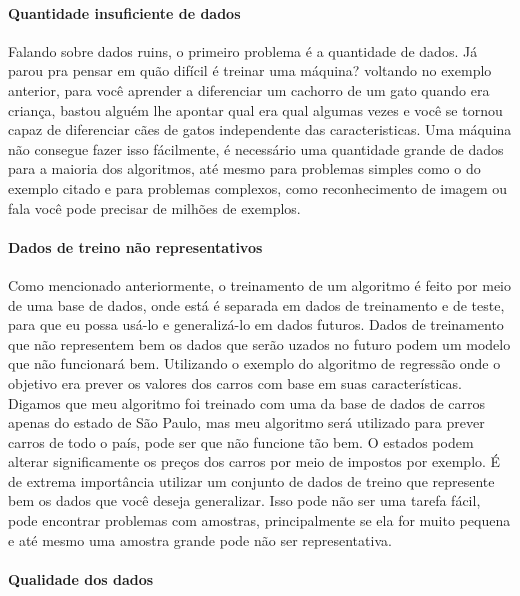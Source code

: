 \documentclass[
  letterpaper,
  DIV=11,
  numbers=noendperiod]{scrreprt}
\let\oldparagraph\paragraph
\renewcommand{\paragraph}[1]{\oldparagraph{#1}\mbox{}}
\begin{document}
\hypertarget{quantidade-insuficiente-de-dados}{%
\paragraph{Quantidade insuficiente de
dados}\label{quantidade-insuficiente-de-dados}}

Falando sobre dados ruins, o primeiro problema é a quantidade de dados.
Já parou pra pensar em quão difícil é treinar uma máquina? voltando no
exemplo anterior, para você aprender a diferenciar um cachorro de um
gato quando era criança, bastou alguém lhe apontar qual era qual algumas
vezes e você se tornou capaz de diferenciar cães de gatos independente
das caracteristicas. Uma máquina não consegue fazer isso fácilmente, é
necessário uma quantidade grande de dados para a maioria dos algoritmos,
até mesmo para problemas simples como o do exemplo citado e para
problemas complexos, como reconhecimento de imagem ou fala você pode
precisar de milhões de exemplos.

\hypertarget{dados-de-treino-nuxe3o-representativos}{%
\paragraph{Dados de treino não
representativos}\label{dados-de-treino-nuxe3o-representativos}}

Como mencionado anteriormente, o treinamento de um algoritmo é feito por
meio de uma base de dados, onde está é separada em dados de treinamento
e de teste, para que eu possa usá-lo e generalizá-lo em dados futuros.
Dados de treinamento que não representem bem os dados que serão uzados
no futuro podem um modelo que não funcionará bem. Utilizando o exemplo
do algoritmo de regressão onde o objetivo era prever os valores dos
carros com base em suas características. Digamos que meu algoritmo foi
treinado com uma da base de dados de carros apenas do estado de São
Paulo, mas meu algoritmo será utilizado para prever carros de todo o
país, pode ser que não funcione tão bem. O estados podem alterar
significamente os preços dos carros por meio de impostos por exemplo. É
de extrema importância utilizar um conjunto de dados de treino que
represente bem os dados que você deseja generalizar. Isso pode não ser
uma tarefa fácil, pode encontrar problemas com amostras, principalmente
se ela for muito pequena e até mesmo uma amostra grande pode não ser
representativa.

\hypertarget{qualidade-dos-dados}{%
\paragraph{Qualidade dos dados}\label{qualidade-dos-dados}}
\end{document}
